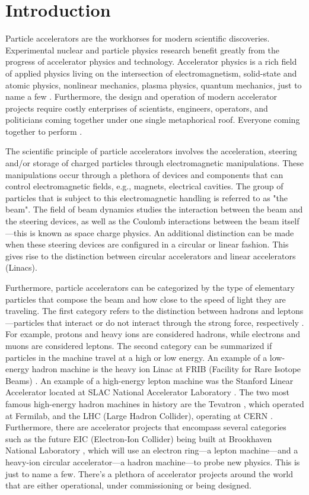 \chapter{Introduction}
\label{sec:ch1}
 
Particle accelerators are the workhorses for modern scientific discoveries. Experimental nuclear and particle physics research benefit greatly from the progress of accelerator physics and technology. Accelerator physics is a rich field of applied physics living on the intersection of electromagnetism, solid-state and atomic physics, nonlinear mechanics, plasma physics, quantum mechanics, just to name a few \cite{sylee}. Furthermore, the design and operation of modern accelerator projects require costly enterprises of scientists, engineers, operators, and politicians coming together under one single metaphorical roof. Everyone coming together to perform  \cite{fermilab1}.         

The scientific principle of particle accelerators involves the acceleration, steering and/or storage of charged particles through electromagnetic manipulations. These manipulations occur through a plethora of devices and components that can control electromagnetic fields, e.g., magnets, electrical cavities. The group of particles that is subject to this electromagnetic handling is referred to as "the beam". The field of beam dynamics studies the interaction between the beam and the steering devices, as well as the Coulomb interactions between the beam itself---this is known as space charge physics. An additional distinction can be made when these steering devices are configured in a circular or linear fashion. This gives rise to the distinction between circular accelerators and linear accelerators (Linacs).

Furthermore, particle accelerators can be categorized by the type of elementary particles that compose the beam and how close to the speed of light they are traveling. The first category refers to the distinction between hadrons and leptons---particles that interact or do not interact through the strong force, respectively \cite{griffiths}. For example, protons and heavy ions are considered hadrons, while electrons and muons are considered leptons. The second category can be summarized if particles in the machine travel at a high or low energy. An example of a low-energy hadron machine is the heavy ion Linac at FRIB (Facility for Rare Isotope Beams) \cite{frib}. An example of a high-energy lepton machine was the Stanford Linear Accelerator located at SLAC National Accelerator Laboratory \cite{slac}. The two most famous high-energy hadron machines in history are the Tevatron \cite{tevatron}, which operated at Fermilab, and the LHC (Large Hadron Collider), operating at CERN \cite{lhc}. Furthermore, there are accelerator projects that encompass several categories such as the future EIC (Electron-Ion Collider) being built at Brookhaven National Laboratory \cite{eic}, which will use an electron ring---a lepton machine---and a heavy-ion circular accelerator---a hadron machine---to probe new physics. This is just to name a few. There's a plethora of accelerator projects around the world that are either operational, under commissioning or being designed. 

